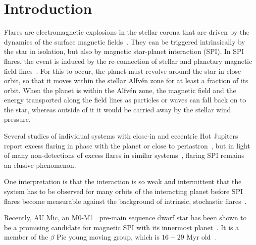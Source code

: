 \documentclass[fleqn,usenatbib]{mnras}%
\begin{document}
%

\section{Introduction}

Flares are electromagnetic explosions in the stellar corona that are driven by the dynamics of the surface magnetic fields~\citep{benz2010}. They can be triggered intrinsically by the star in isolation, but also by magnetic star-planet interaction (SPI). In SPI flares, the event is induced by the re-connection of stellar and planetary magnetic field lines~\citep{saur2013magnetic,lanza2018close-by,fischer2019}. For this to occur, the planet must revolve around the star in close orbit, so that it moves within the stellar Alfv\'en zone for at least a fraction of its orbit. When the planet is within the Alfv\'en zone, the magnetic field and the energy transported along the field lines as particles or waves can fall back on to the star, whereas outside of it it would be carried away by the stellar wind pressure. 



Several studies of individual systems with close-in and eccentric Hot Jupiters report excess flaring in phase with the planet or close to periastron~\citep{shkolnik2005,pillitteri2011,maggio2015}, but in light of many non-detections of excess flares in similar systems~\citep{figueira2016, fischer2019}, flaring SPI remains an elusive phenomenon. 

One interpretation is that the interaction is so weak and intermittent that the system has to be observed for many orbits of the interacting planet before SPI flares become measurable against the background of intrinsic, stochastic flares~\citep{shkolnik2008,lanza2009, saur2013magnetic,strugarek2015}.

Recently, AU Mic, an M0-M1~\citep{pecaut2013,gaidos2014} pre-main sequence dwarf star has been shown to be a promising candidate for magnetic SPI with its innermost planet~\citep{kavanagh2021}. It is a member of the $\beta$ Pic young moving group, which is $16-29$ Myr old~\citep{malo2014,binks2014,mamajek2014,bell2015,binks2016,shkolnik2017,miretroig2020}. %
\end{document}

